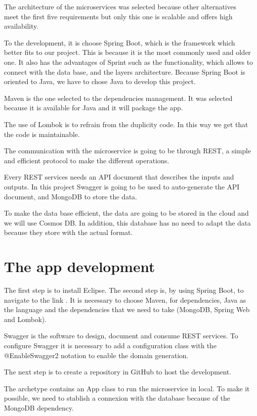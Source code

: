 \documentclass[12pt]{report} %
\begin{document}
The architecture of the microservices was selected because other alternatives meet the first five requirements but only this one is scalable and offers high availability.

To the development, it is choose Spring Boot, which is the framework which better fits to our project. This is because it is the most commonly used and older one. It also has the advantages of Sprint such as the functionality, which allows to connect with the data base, and the layers architecture. Because Spring Boot is oriented to Java, we have to chose Java to develop this project.

Maven is the one selected to the dependencies management. It was selected because it is available for Java and it will package the app.

The use of Lombok is to refrain from the duplicity code. In this way we get that the code is maintainable.

The communication with the microservice is going to be through REST, a simple and efficient protocol to make the different operations.

Every REST services needs an API document that describes the inputs and outputs. In this project Swagger is going to be used to auto-generate the API document, and MongoDB to store the data.

To make the data base efficient, the data are going to be stored in the cloud and we will use Cosmos DB. In addition, this database has no need to adapt the data because they store with the actual format.

\section{The app development}

The first step is to install Eclipse. The second step is, by using Spring Boot, to navigate to the link \cite{startSpring}. It is necessary to choose Maven, for dependencies, Java as the language and the dependencies that we need to take (MongoDB, Spring Web and Lombok).

Swagger is the software to design, document and consume REST services. To configure Swagger it is necessary to add a configuration class with the @EnableSwagger2 notation to enable the domain generation.

The next step is to create a repository in GitHub \cite{repositorio} to host the development.

The archetype contains an App class to run the microservice in local. To make it possible, we need to stablish a connexion with the database because of the MongoDB dependency.
\end{document}
